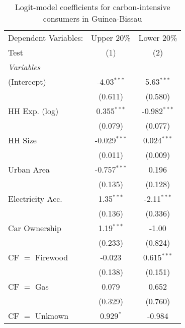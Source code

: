 
\begin{table}[htbp!]
   \centering
   \small
   \begin{adjustbox}{width = 1\textwidth, max height = 0.95\textheight, center}
      \begin{threeparttable}[b]
         \caption{\label{tab:Logit_1_GNB} Logit-model coefficients for carbon-intensive consumers in Guinea-Bissau}
         \begin{tabular}{lcc}
            \tabularnewline \midrule \midrule
            Dependent Variables: & Upper 20\%     & Lower 20\%\\   
            Test                 & (1)            & (2)\\  
            \midrule
            \emph{Variables}\\
            (Intercept)          & -4.03$^{***}$  & 5.63$^{***}$\\   
                                 & (0.611)        & (0.580)\\   
            HH Exp. (log)        & 0.355$^{***}$  & -0.982$^{***}$\\   
                                 & (0.079)        & (0.077)\\   
            HH Size              & -0.029$^{***}$ & 0.024$^{***}$\\   
                                 & (0.011)        & (0.009)\\   
            Urban Area           & -0.757$^{***}$ & 0.196\\   
                                 & (0.135)        & (0.128)\\   
            Electricity Acc.     & 1.35$^{***}$   & -2.11$^{***}$\\   
                                 & (0.136)        & (0.336)\\   
            Car Ownership        & 1.19$^{***}$   & -1.00\\   
                                 & (0.233)        & (0.824)\\   
            CF $=$ Firewood      & -0.023         & 0.615$^{***}$\\   
                                 & (0.138)        & (0.151)\\   
            CF $=$ Gas           & 0.079          & 0.652\\   
                                 & (0.329)        & (0.760)\\   
            CF $=$ Unknown       & 0.929$^{*}$    & -0.984\\   

\end{tabular}
\end{threeparttable}
\end{adjustbox}
\end{table}
